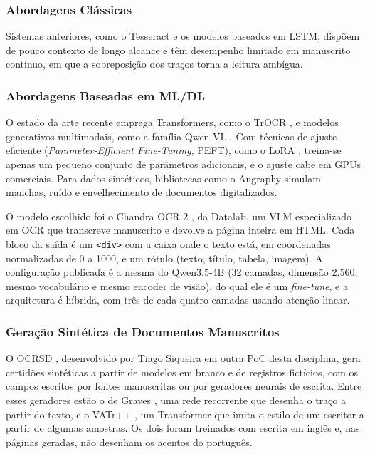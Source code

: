 \documentclass[12pt,a4paper]{article}
\begin{document}
\subsubsection{Abordagens Clássicas}
Sistemas anteriores, como o Tesseract e os modelos baseados em LSTM, dispõem de pouco contexto de longo alcance e têm desempenho limitado em manuscrito contínuo, em que a sobreposição dos traços torna a leitura ambígua.

\subsubsection{Abordagens Baseadas em ML/DL}
O estado da arte recente emprega Transformers, como o TrOCR \cite{trocr2021}, e modelos generativos multimodais, como a família Qwen-VL \cite{qwen2vl}. Com técnicas de ajuste eficiente (\emph{Parameter-Efficient Fine-Tuning}, PEFT), como o LoRA \cite{lora2022, peft2022}, treina-se apenas um pequeno conjunto de parâmetros adicionais, e o ajuste cabe em GPUs comerciais. Para dados sintéticos, bibliotecas como o Augraphy \cite{augraphy2022} simulam manchas, ruído e envelhecimento de documentos digitalizados.

O modelo escolhido foi o Chandra OCR 2 \cite{chandra2026}, da Datalab, um VLM especializado em OCR que transcreve manuscrito e devolve a página inteira em HTML. Cada bloco da saída é um \texttt{<div>} com a caixa onde o texto está, em coordenadas normalizadas de 0 a 1000, e um rótulo (texto, título, tabela, imagem). A configuração publicada é a mesma do Qwen3.5-4B \cite{qwen35} (32 camadas, dimensão 2.560, mesmo vocabulário e mesmo encoder de visão), do qual ele é um \emph{fine-tune}, e a arquitetura é híbrida, com três de cada quatro camadas usando atenção linear.

\subsubsection{Geração Sintética de Documentos Manuscritos}
O OCRSD \cite{ocrsd}, desenvolvido por Tiago Siqueira em outra PoC desta disciplina, gera certidões sintéticas a partir de modelos em branco e de registros fictícios, com os campos escritos por fontes manuscritas ou por geradores neurais de escrita. Entre esses geradores estão o de Graves \cite{graves2013}, uma rede recorrente que desenha o traço a partir do texto, e o VATr++ \cite{vatrpp2024}, um Transformer que imita o estilo de um escritor a partir de algumas amostras. Os dois foram treinados com escrita em inglês e, nas páginas geradas, não desenham os acentos do português.
\end{document}
